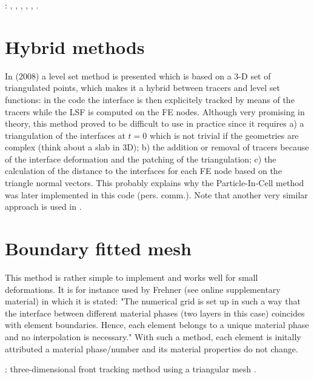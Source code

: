 \Literature: 
\textcite{zhha03},
\textcite{liva05},
\textcite{liva06a},
\textcite{liva06b},
\textcite{kaus05},
\textcite{mulyukova}.

\section{Hybrid methods}

In \textcite{brtf08} (2008) a level set method is presented which is based on a 3-D set
of triangulated points, which makes it a hybrid between tracers and level set functions:
in the \douar code the interface is then explicitely tracked by means of the tracers while the LSF is computed 
on the FE nodes. Although very promising in theory, this method proved to be difficult to use in practice
since it requires a) a triangulation of the interfaces at $t=0$ which is not trivial if the geometries
are complex (think about a slab in 3D); b) the addition or removal of tracers because of the interface deformation
and the patching of the triangulation; c) the calculation of the distance to the interfaces for each 
FE node based on the triangle normal vectors. 
This probably explains why the Particle-In-Cell method was later implemented in this code (pers. comm.).
Note that another very similar approach is used in \cite{saev10}.

\section{Boundary fitted mesh}

This method is rather simple to implement and works well for small deformations. It is 
for instance used by Frehner \cite{freh14} (see online supplementary material) in which it is 
stated: "The numerical grid is set up in such a way that the interface
between different material phases (two layers in this case) coincides with element boundaries. Hence, each
element belongs to a unique material phase and no interpolation is necessary."
With such a method, each element is initally attributed a material phase/number and its material
properties do not change. 


\vspace{2cm} 

\Literature: three-dimensional front tracking method using a triangular mesh \cite{sclo03}.

